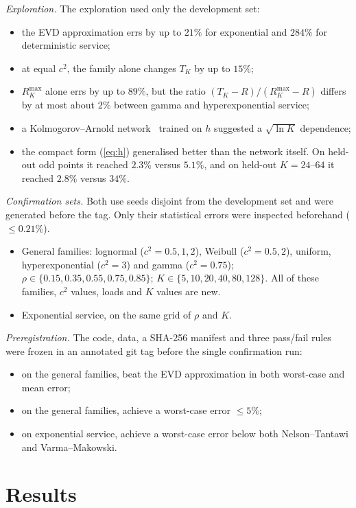\documentclass[11pt]{article}
\begin{document}
\textit{Exploration.} The exploration used only the development set:
\begin{itemize}
\item the EVD approximation errs by up to $21\%$ for exponential and $284\%$ for deterministic service;
\item at equal $c^2$, the family alone changes $T_K$ by up to $15\%$;
\item $R^{\max}_K$ alone errs by up to $89\%$, but the ratio $(T_K-R)/(R^{\max}_K-R)$ differs by at most about $2\%$
between gamma and hyperexponential service;
\item a Kolmogorov--Arnold network~\cite{Liu2024kan} trained on $h$ suggested a $\sqrt{\ln K}$ dependence;
\item the compact form (\ref{eq:h}) generalised better than the network itself. On held-out odd points it reached
$2.3\%$ versus $5.1\%$, and on held-out $K=24$--$64$ it reached $2.8\%$ versus $34\%$.
\end{itemize}

\textit{Confirmation sets.} Both use seeds disjoint from the development set and were generated before the tag. Only
their statistical errors were inspected beforehand ($\le0.21\%$).
\begin{itemize}
\item General families: lognormal ($c^2=0.5,1,2$), Weibull ($c^2=0.5,2$), uniform, hyperexponential ($c^2=3$) and
gamma ($c^2=0.75$); $\rho\in\{0.15,0.35,0.55,0.75,0.85\}$; $K\in\{5,10,20,40,80,128\}$. All of these families, $c^2$
values, loads and $K$ values are new.
\item Exponential service, on the same grid of $\rho$ and $K$.
\end{itemize}

\textit{Preregistration.} The code, data, a SHA-256 manifest and three pass/fail rules were frozen in an annotated git
tag before the single confirmation run:
\begin{itemize}
\item[(R1)] on the general families, beat the EVD approximation in both worst-case and mean error;
\item[(R2)] on the general families, achieve a worst-case error $\le5\%$;
\item[(R3)] on exponential service, achieve a worst-case error below both Nelson--Tantawi and Varma--Makowski.
\end{itemize}

\section{Results}
\end{document}

